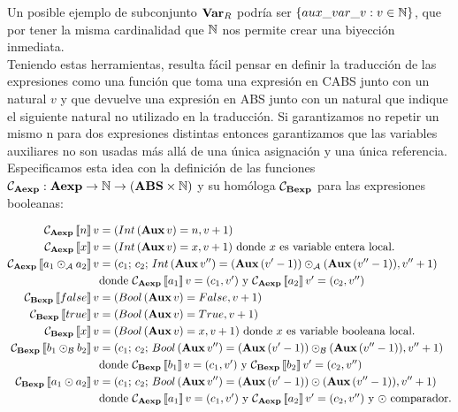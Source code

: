 Un posible ejemplo de subconjunto $\textbf{Var}_R$ podría ser $\{aux\_var\_v: v \in \mathbb{N}\}$, que por tener la misma cardinalidad que $\mathbb{N}$ nos permite crear una biyección inmediata.\\

Teniendo estas herramientas, resulta fácil pensar en definir la traducción de las expresiones como una función que toma una expresión en CABS junto con un natural $v$ y que devuelve una expresión en ABS junto con un natural que indique el siguiente natural no utilizado en la traducción. Si garantizamos no repetir un mismo n para dos expresiones distintas entonces garantizamos que las variables auxiliares no son usadas más allá de una única asignación y una única referencia.\\

Especificamos esta idea con la definición de las funciones $\mathcal{C}_{\textbf{Aexp}}: \textbf{Aexp} \rightarrow \mathbb{N} \rightarrow (\textbf{ABS} \times \mathbb{N})$ y su homóloga  $\mathcal{C}_{\textbf{Bexp}}$ para las expresiones booleanas:

\begin{align*}
  \mathcal{C}_{\textbf{Aexp}}\left\llbracket n \right\rrbracket v &= (Int\, (\textbf{Aux}\, v) = n, v + 1) \\
  \mathcal{C}_{\textbf{Aexp}}\left\llbracket x \right\rrbracket v &= (Int\, (\textbf{Aux}\, v) = x, v + 1) \mbox{ donde $x$ es variable entera local.} \\
  \mathcal{C}_{\textbf{Aexp}}\left\llbracket a_1 \odot_{\mathcal{A}} a_2 \right\rrbracket v &= (c_1\mbox{; } c_2 \mbox{; } Int\, (\textbf{Aux}\, v'') =  (\textbf{Aux}\, (v' - 1))  \odot_{\mathcal{A}}  (\textbf{Aux}\, (v'' - 1)) , v'' + 1) \\
  &\mbox{donde $\mathcal{C}_{\textbf{Aexp}}\left\llbracket a_1 \right\rrbracket v = (c_1, v')$ y $\mathcal{C}_{\textbf{Aexp}}\left\llbracket a_2 \right\rrbracket v' = (c_2, v'')$} \\
  \mathcal{C}_{\textbf{Bexp}}\left\llbracket false \right\rrbracket v &= (Bool\, (\textbf{Aux}\, v) = False, v + 1) \\
  \mathcal{C}_{\textbf{Bexp}}\left\llbracket true \right\rrbracket v &= (Bool\, (\textbf{Aux}\, v) = True, v + 1) \\
  \mathcal{C}_{\textbf{Bexp}}\left\llbracket x \right\rrbracket v &= (Bool\, (\textbf{Aux}\, v) = x, v + 1) \mbox{ donde $x$ es variable booleana local.} \\
  \mathcal{C}_{\textbf{Bexp}}\left\llbracket b_1 \odot_{\mathcal{B}} b_2 \right\rrbracket v &= (c_1\mbox{; } c_2 \mbox{; } Bool\, (\textbf{Aux}\, v'') =  (\textbf{Aux}\, (v' - 1))  \odot_{\mathcal{B}}  (\textbf{Aux}\, (v'' - 1)) , v'' + 1) \\
  &\mbox{donde $\mathcal{C}_{\textbf{Bexp}}\left\llbracket b_1 \right\rrbracket v = (c_1, v')$ y $\mathcal{C}_{\textbf{Bexp}}\left\llbracket b_2 \right\rrbracket v' = (c_2, v'')$} \\
  \mathcal{C}_{\textbf{Bexp}}\left\llbracket a_1 \odot a_2 \right\rrbracket v &= (c_1\mbox{; } c_2 \mbox{; } Bool\, (\textbf{Aux}\, v'') =  (\textbf{Aux}\, (v' - 1))  \odot  (\textbf{Aux}\, (v'' - 1)) , v'' + 1) \\
  &\mbox{donde $\mathcal{C}_{\textbf{Aexp}}\left\llbracket a_1 \right\rrbracket v = (c_1, v')$ y $\mathcal{C}_{\textbf{Aexp}}\left\llbracket a_2 \right\rrbracket v' = (c_2, v'')$ y $\odot$ comparador.} \\
\end{align*}

